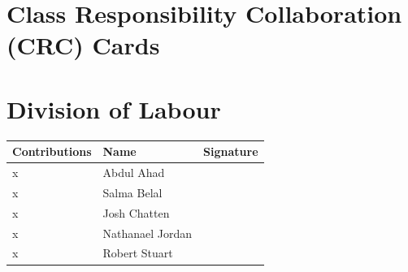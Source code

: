 \documentclass[titlepage]{article}
\begin{document}

    
\section{Class Responsibility Collaboration (CRC) Cards}
\label{sec:class_responsibility_collaboration_crc_cards}

%
%    


\newpage
\appendix
\section{Division of Labour}%
\label{sec:division_of_labour}

\begin{table}[htbp]
\vspace{-0.06in}
\begin{center}
\setlength{\extrarowheight}{4.0pt}
\begin{tabular}{m{} m{} m{}} 
\hline
\textbf{Contributions} & \textbf{Name} & \textbf{Signature}\\
\hline
x & Abdul Ahad & \\
\hline
x & Salma Belal & \\
\hline
x & Josh Chatten & \\
\hline
x & Nathanael Jordan  & \\
\hline
x & Robert Stuart & \\
\hline
\end{tabular}
\end{center}
\label{divOfLabour}
\end{table}
\end{document}
